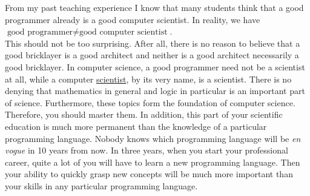 From my past teaching experience I know that many students think that a good programmer already is a
good computer scientist.  In reality, we have
\\[0.2cm]
\hspace*{1.3cm}
$\textrm{good programmer} \not= \textrm{good computer scientist}$.
\\[0.2cm]
This should not be too surprising.  After all, there is no reason to believe that a good bricklayer is a good
architect and neither is a good architect necessarily a good bricklayer.
In computer science, a good programmer need not be a scientist at all, while a {\color{blue}computer
  \underline{scientist}}, by its very name, is a {\color{blue}scientist}.  
There is no denying that {\color{blue}mathematics} in general and 
{\color{blue}logic} in particular is an important part of science.  Furthermore, these topics form the
foundation of computer science.  Therefore, you should master them.  In addition, this
part of your scientific education is much more permanent than the knowledge of a particular programming
language.  Nobody knows which programming language will be \emph{en vogue} in 10 years from now.  In three 
years, when you start your professional career, quite a lot of you will have to learn a new
programming language.   Then your ability to quickly grasp new concepts will be much more important than your
skills in any particular programming language. 

